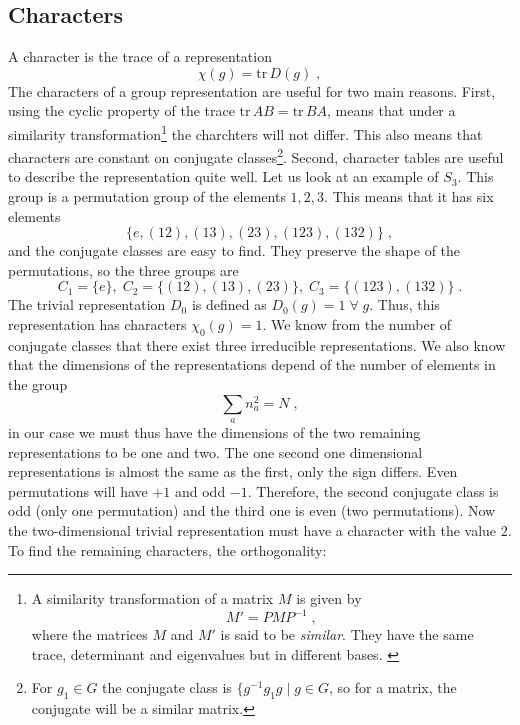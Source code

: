 \subsection{Characters}
A character is the trace of a representation
\begin{equation}
    \chi(g) =\text{tr}\,D(g)\;,
\end{equation}
The characters of a group representation are useful for two main reasons. First, using the cyclic property of the trace $\text{tr}\,AB=\text{tr}\, BA$, means that under a similarity transformation\footnote{A similarity transformation of a matrix $M$ is given by 
\begin{equation}
    M'=PMP^{-1}\;,
\end{equation} 
where the matrices $M$ and $M'$ is said to be \textit{similar}. They have the same trace, determinant and eigenvalues but in different bases. \cite{missing source}} the charchters will not differ. This also means that characters are constant on conjugate classes\footnote{For $g_1\in G$ the conjugate class is $\{g^{-1}g_1g ∣ g\in G$, so for a matrix, the conjugate will be a similar matrix.}. Second, character tables are useful to describe the representation quite well. Let us look at an example of $S_3$. This group is a permutation group of the elements $1,2,3$. This means that it has six elements
\begin{equation}
    \{e,(12),(13),(23),(123),(132)\}\;,
\end{equation}
and the conjugate classes are easy to find. They preserve the shape of the permutations, so the three groups are
\begin{equation}
    C_1=\{e\},\;C_2=\{(12),(13),(23)\},\;C_3=\{(123),(132)\}\;.
\end{equation}
The trivial representation $D_0$ is defined as $D_0(g)=1\;\forall \; g$. Thus, this representation has characters $\chi_0(g)=1$. We know from the number of conjugate classes that there exist three irreducible representations. We also know that the dimensions of the representations depend of the number of elements in the group
\begin{equation}
    \sum_an_a^2=N\;,
\end{equation}
in our case we must thus have the dimensions of the two remaining representations to be one and two. The one second one dimensional representations is almost the same as the first, only the sign differs. Even permutations will have $+1$ and odd $-1$. Therefore, the second conjugate class is odd (only one permutation) and the third one is even (two permutations). Now the two-dimensional trivial representation must have a character with the value $2$. To find the remaining characters, the orthogonality:

